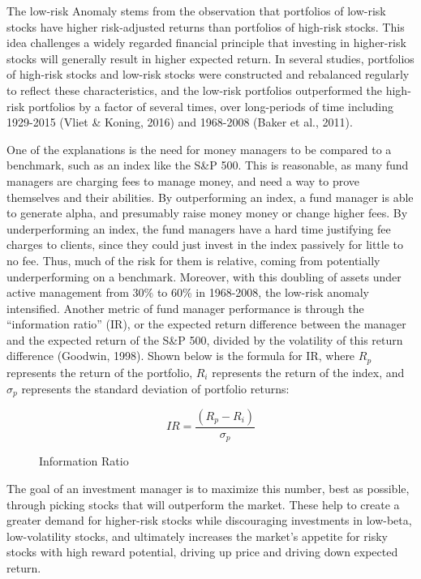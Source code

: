 \documentclass[12pt,twoside]{reedthesis}
\theoremstyle{definition}
\theoremstyle{definition}
\theoremstyle{definition}
\theoremstyle{remark}
\begin{document}
The low-risk Anomaly stems from the observation that portfolios of
low-risk stocks have higher risk-adjusted returns than portfolios of
high-risk stocks. This idea challenges a widely regarded financial
principle that investing in higher-risk stocks will generally result in
higher expected return. In several studies, portfolios of high-risk
stocks and low-risk stocks were constructed and rebalanced regularly to
reflect these characteristics, and the low-risk portfolios outperformed
the high-risk portfolios by a factor of several times, over long-periods
of time including 1929-2015 (Vliet \& Koning, 2016) and 1968-2008 (Baker
et al., 2011).

One of the explanations is the need for money managers to be compared to
a benchmark, such as an index like the S\&P 500. This is reasonable, as
many fund managers are charging fees to manage money, and need a way to
prove themselves and their abilities. By outperforming an index, a fund
manager is able to generate alpha, and presumably raise money money or
change higher fees. By underperforming an index, the fund managers have
a hard time justifying fee charges to clients, since they could just
invest in the index passively for little to no fee. Thus, much of the
risk for them is relative, coming from potentially underperforming on a
benchmark. Moreover, with this doubling of assets under active
management from 30\% to 60\% in 1968-2008, the low-risk anomaly
intensified. Another metric of fund manager performance is through the
``information ratio'' (IR), or the expected return difference between
the manager and the expected return of the S\&P 500, divided by the
volatility of this return difference (Goodwin, 1998). Shown below is the
formula for IR, where \(R_p\) represents the return of the portfolio,
\(R_i\) represents the return of the index, and \(\sigma_p\) represents
the standard deviation of portfolio returns:
\begin{figure}
$$ IR = \frac{(R_p - R_i)} {\sigma_p}$$
\caption{Information Ratio}
\end{figure}
The goal of an investment manager is to maximize this number, best as
possible, through picking stocks that will outperform the market. These
help to create a greater demand for higher-risk stocks while
discouraging investments in low-beta, low-volatility stocks, and
ultimately increases the market's appetite for risky stocks with high
reward potential, driving up price and driving down expected return.
\end{document}
